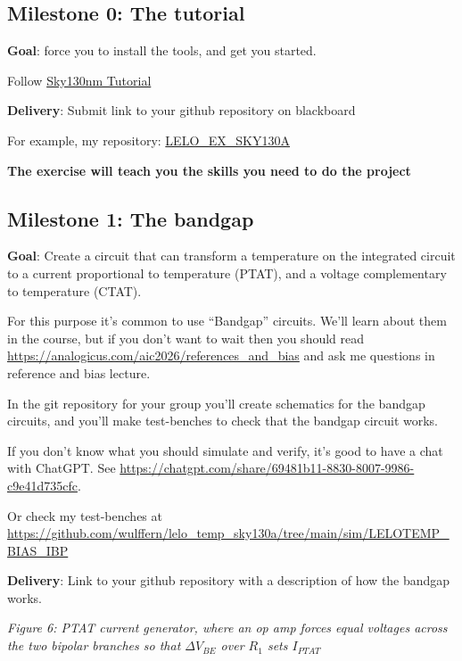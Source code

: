 \subsection{Milestone 0: The tutorial}\label{milestone-0-the-tutorial}

\textbf{Goal}: force you to install the tools, and get you started.

Follow \href{https://analogicus.com/aic2026/sky130nm_tutorial}{Sky130nm
Tutorial}

\textbf{Delivery}: Submit link to your github repository on blackboard

For example, my repository:
\href{http://analogicus.com/lelo_ex_sky130a/}{LELO\_EX\_SKY130A}

\textbf{The exercise will teach you the skills you need to do the
project}

\subsection{Milestone 1: The bandgap}\label{milestone-1-the-bandgap}

\textbf{Goal}: Create a circuit that can transform a temperature on the
integrated circuit to a current proportional to temperature (PTAT), and
a voltage complementary to temperature (CTAT).

For this purpose it's common to use ``Bandgap'' circuits. We'll learn
about them in the course, but if you don't want to wait then you should
read \url{https://analogicus.com/aic2026/references_and_bias} and ask me
questions in reference and bias lecture.

In the git repository for your group you'll create schematics for the
bandgap circuits, and you'll make test-benches to check that the bandgap
circuit works.

If you don't know what you should simulate and verify, it's good to have
a chat with ChatGPT. See
\url{https://chatgpt.com/share/69481b11-8830-8007-9986-c9e41d735cfc}.

Or check my test-benches at
\url{https://github.com/wulffern/lelo_temp_sky130a/tree/main/sim/LELOTEMP_BIAS_IBP}

\textbf{Delivery}: Link to your github repository with a description of
how the bandgap works.


{
\centering
{}
}

\emph{Figure 6: PTAT current generator, where an op amp forces equal
voltages across the two bipolar branches so that \(\Delta V_{BE}\) over
\(R_1\) sets \(I_{PTAT}\)}

